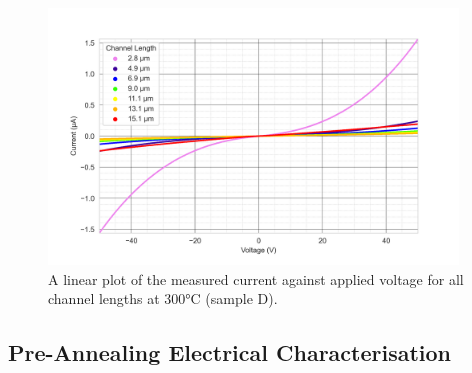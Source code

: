 \begin{figure}[h]
    \centering
    \includegraphics[width=0.97\textwidth]{Chapter3/Figs/Raster/Sample D 2019/IV/50v IV characteristics at 300 C.png}
    \caption{A linear plot of the measured current against applied voltage for all channel lengths at 300\si{\degreeCelsius} (sample D).}
    \label{appfig:D_current_voltage_300_50v}
\end{figure}
\label{app:I_V_sample_D_50V}

\subsection{Pre-Annealing Electrical Characterisation}
